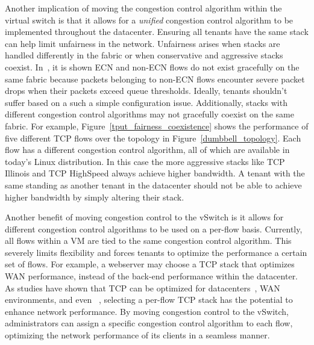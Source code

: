 Another implication of moving the congestion control algorithm within the virtual switch
is that it allows for a {\em unified} congestion control algorithm to be implemented 
throughout the datacenter. Ensuring all tenants have the same stack can help limit 
unfairness in the network. Unfairness arises when stacks are handled differently in the 
fabric or when conservative and aggressive stacks coexist. In~\cite{judd2015nsdi}, it is 
shown ECN and non-ECN flows do not exist gracefully on the same fabric because packets 
belonging to non-ECN flows encounter severe packet drops when their packets exceed queue 
thresholds. Ideally, tenants shouldn't suffer based on a such a simple configuration 
issue. Additionally, stacks with different congestion control algorithms may not 
gracefully coexist on the same fabric. For example, Figure~\ref{tput_fairness_coexistence} shows the performance of five different TCP flows over the topology in Figure~\ref{dumbbell_topology}. Each flow has a different congestion control algorithm, all of which are 
available in today's Linux distribution. In this case the more aggressive stacks like 
TCP Illinois and TCP HighSpeed always achieve higher bandwidth. A tenant with the same 
standing as another tenant in the datacenter should not be able to achieve higher 
bandwidth by simply altering their stack.

Another benefit of moving congestion control to the vSwitch is it allows for different 
congestion control algorithms to be used on a per-flow basis. Currently, all flows within
a VM are tied to the same congestion control algorithm. This severely limits flexibility 
and forces tenants to optimize the performance a certain set of flows. For example, a 
webserver may choose a TCP stack that optimizes WAN performance, instead of the back-end 
performance within the datacenter. As studies have shown that TCP can be optimized for 
datacenters~\cite{alizadeh2011data, stephens2014practical, wu2010ictcp, mittal2015timely, jose2015high}, WAN environments, and even ~, selecting a per-flow TCP stack has the potential to enhance network 
performance. By moving congestion control to the vSwitch, administrators can assign a 
specific congestion control algorithm to each flow, optimizing the network performance of
its clients in a seamless manner.~

